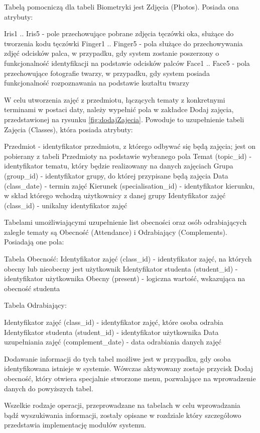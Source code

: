 Tabelą pomocniczą dla tabeli Biometryki jest Zdjęcia (Photos). Posiada ona atrybuty:

Iris1 .. Iris5 - pole przechowujące pobrane zdjęcia tęczówki oka, służące do tworzenia kodu tęczówki
Finger1 .. Finger5 - pola służące do przechowywania zdjęć odcisków palca, w przypadku, gdy system zostanie poszerzony o funkcjonalność identyfikacji na podstawie odcisków palców
Face1 .. Face5 - pola przechowujące fotografie twarzy, w przypadku, gdy system posiada funkcjonalność rozpoznawania na podstawie kształtu twarzy

W celu utworzenia zajęć z przedmiotu, łączących tematy z konkretnymi terminami w postaci daty, należy wypełnić pola w zakładce Dodaj zajęcia, przedstawionej na rysunku \ref{fig:dodajZajecia}. Powoduje to uzupełnienie tabeli Zajęcia (Classes), która posiada atrybuty:

Przedmiot - identyfikator przedmiotu, z którego odbywać się będą zajęcia; jest on pobierany z tabeli Przedmioty na podstawie wybranego pola
Temat (topic_id) - identyfikator tematu, który będzie realizowany na danych zajęciach
Grupa (group_id) - identyfikator grupy, do której przypisane będą zajęcia
Data (class_date) - termin zajęć
Kierunek (specialisation_id) - identyfikator kierunku, w skład którego wchodzą użytkownicy z danej grupy
Identyfikator zajęć (class_id) - unikalny identyfikator zajęć

Tabelami umożliwiającymi uzupełnienie list obecności oraz osób odrabiających zaległe tematy są Obecność (Attendance) i Odrabiający (Complements). Posiadają one pola:

Tabela Obecność:
Identyfikator zajęć (class_id) - identyfikator zajęć, na których obecny lub nieobecny jest użytkownik
Identyfikator studenta (student_id) - identyfikator użytkownika
Obecny (present) - logiczna wartość, wskazująca na obecność studenta

Tabela Odrabiający:

Identyfikator zajęć (class_id) - identyfikator zajęć, które osoba odrabia
Identyfikator studenta (student_id) - identyfikator użytkownika
Data uzupełniania zajęć (complement_date) - data odrabiania danych zajęć

Dodawanie informacji do tych tabel możliwe jest w przypadku, gdy osoba identyfikowana istnieje w systemie. Wówczas aktywowany zostaje przycisk Dodaj obecność, który otwiera specjalnie stworzone menu, pozwalające na wprowadzenie danych do powyższych tabel.

Wszelkie rodzaje operacji, przeprowadzane na tabelach w celu wprowadzania bądź wyszukiwania informacji, zostały opisane w rozdziale który szczegółowo przedstawia implementację modułów systemu.
